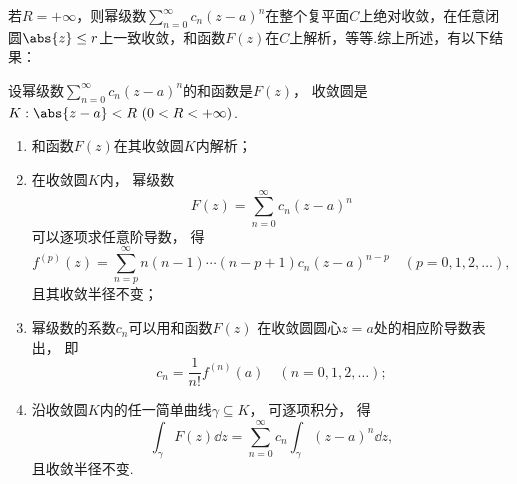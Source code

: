 若\(R=+\infty\)，则幂级数\(\sum_{n=0}^\infty c_n (z-a)^n\)在整个复平面\(C\)上绝对收敛，在任意闭圆\(\abs{z} \leq r\)上一致收敛，和函数\(F(z)\)在\(C\)上解析，等等.综上所述，有以下结果：
\begin{theorem}\label{theorem:解析函数的级数表示.幂级数的和函数的性质}
设幂级数\(\sum_{n=0}^\infty c_n (z-a)^n\)的和函数是\(F(z)\)，
收敛圆是\(K: \abs{z-a}<R\ (0<R<+\infty)\).
\begin{enumerate}
	\item 和函数\(F(z)\)在其收敛圆\(K\)内解析；

	\item 在收敛圆\(K\)内，
	幂级数\begin{equation*}
		F(z) = \sum_{n=0}^\infty c_n (z-a)^n
	\end{equation*}
	可以逐项求任意阶导数，
	得\begin{equation}
		f^{(p)}(z) = \sum_{n=p}^\infty n(n-1)\dotsm(n-p+1) c_n (z-a)^{n-p}
		\quad(p=0,1,2,\dotsc),
	\end{equation}
	且其收敛半径不变；

	\item 幂级数的系数\(c_n\)可以用和函数\(F(z)\)
	在收敛圆圆心\(z=a\)处的相应阶导数表出，
	即\begin{equation}
		c_n = \frac{1}{n!} f^{(n)}(a)
		\quad(n=0,1,2,\dotsc);
	\end{equation}

	\item 沿收敛圆\(K\)内的任一简单曲线\(\gamma \subseteq K\)，
	可逐项积分，
	得\begin{equation}
		\int_\gamma F(z) \dd{z}
		= \sum_{n=0}^\infty c_n \int_\gamma (z-a)^n \dd{z},
	\end{equation}
	且收敛半径不变.
\end{enumerate}
\end{theorem}

